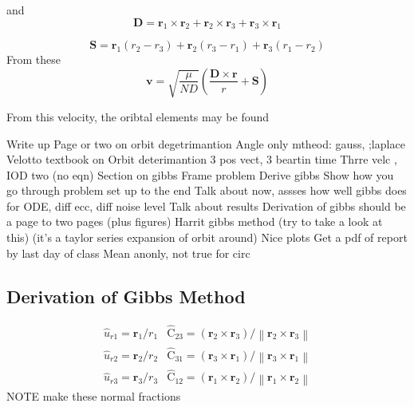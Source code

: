 \documentclass[12pt]{article}
\begin{document}
	and
	\begin{equation}
	\mathbf { D } = \mathbf { r } _ { 1 } \times \mathbf { r } _ { 2 } + \mathbf { r } _ { 2 } \times \mathbf { r } _ { 3 } + \mathbf { r } _ { 3 } \times \mathbf { r } _ { 1 }
	\end{equation}
	
	\begin{equation}
	\mathbf { S } = \mathbf { r } _ { 1 } \left( r _ { 2 } - r _ { 3 } \right) + \mathbf { r } _ { 2 } \left( r _ { 3 } - r _ { 1 } \right) + \mathbf { r } _ { 3 } \left( r _ { 1 } - r _ { 2 } \right)
	\end{equation}
	From these
	\begin{equation}
	\mathbf { v } = \sqrt { \frac { \mu } { N D } } \left( \frac { \mathbf { D } \times \mathbf { r } } { r } + \mathbf { S } \right)
	\end{equation}
	
	From this velocity, the oribtal elements may be found
	
	
	Write up
	Page or two on orbit degetrimantion
	Angle only mtheod: gauss, ;laplace
	Velotto textbook on Orbit deterimantion
	3 pos vect, 3 beartin time
	Thrre velc , IOD two
	(no eqn)
	Section on gibbs
	Frame problem
	Derive gibbs
	Show how you go through problem set up to the end
	Talk about now, assses how well gibbs does for ODE, diff ecc, diff noise level
	Talk about results
	Derivation of gibbs should be a page to two pages (plus figures)
	Harrit gibbs method (try to take a look at this) (it’s a taylor series expansion of orbit around)
	Nice plots
	Get a pdf of report by last day of class
	Mean  anonly, not true for circ
	
	
	\subsection{Derivation of Gibbs Method}
	\begin{eqnarray}
	\hat { { u } } _ { r 1 } = \mathbf { r } _ { 1 } / r _ { 1 }& \hat { \mathrm { C } } _ { 23 } = \left( \mathbf { r } _ { 2 } \times \mathbf { r } _ { 3 } \right) / \left\| \mathbf { r } _ { 2 } \times \mathbf { r } _ { 3 } \right\|\\
	\hat {{ u } } _ { r 2 } = \mathbf { r } _ { 2 } / r _ { 2 }&\hat { \mathrm { C } } _ { 31 } = \left( \mathbf { r } _ { 3 } \times \mathbf { r } _ { 1} \right) / \left\| \mathbf { r } _ { 3 } \times \mathbf { r } _ { 1 } \right\|\\
		\hat {{ u } } _ { r 3 } = \mathbf { r } _ { 3 } / r _ { 3} & \hat { \mathrm { C } } _ { 12 } = \left( \mathbf { r } _ { 1 } \times \mathbf { r } _ { 2 } \right) / \left\| \mathbf { r } _ { 1} \times \mathbf { r } _ { 2 } \right\|
	\end{eqnarray}
	NOTE make these normal fractions
	\fi
\end{document}
